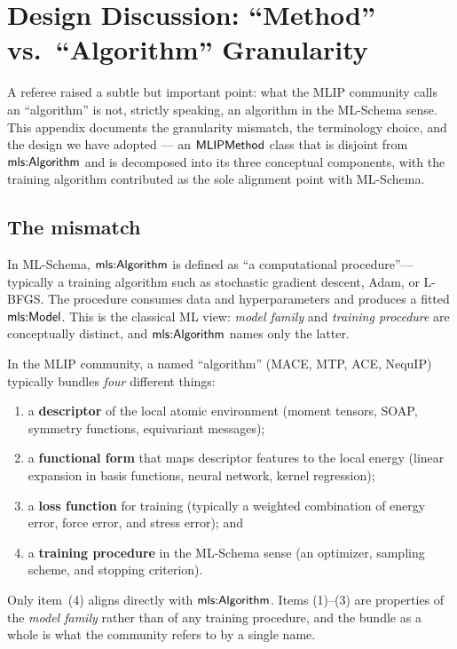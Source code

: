 \section{Design Discussion: ``Method'' vs.\ ``Algorithm'' Granularity}
\label{sec:appendix-method}

A referee raised a subtle but important point: what the MLIP community
calls an ``algorithm'' is not, strictly speaking, an algorithm in the
ML-Schema sense. This appendix documents the granularity mismatch, the
terminology choice, and the design we have adopted --- an
$\mathsf{MLIPMethod}$ class that is disjoint from $\mathsf{mls{:}Algorithm}$ and is
decomposed into its three conceptual components, with the training
algorithm contributed as the sole alignment point with ML-Schema.

\subsection{The mismatch}

In ML-Schema, $\mathsf{mls{:}Algorithm}$ is defined as ``a computational
procedure''---typically a training algorithm such as stochastic gradient
descent, Adam, or L-BFGS. The procedure consumes data and hyperparameters
and produces a fitted $\mathsf{mls{:}Model}$. This is the classical ML view:
\emph{model family} and \emph{training procedure} are conceptually
distinct, and $\mathsf{mls{:}Algorithm}$ names only the latter.

In the MLIP community, a named ``algorithm'' (MACE, MTP, ACE, NequIP)
typically bundles \emph{four} different things:
%
\begin{enumerate}
\item a \textbf{descriptor} of the local atomic environment (moment
  tensors, SOAP, symmetry functions, equivariant messages);
\item a \textbf{functional form} that maps descriptor features to the
  local energy (linear expansion in basis functions, neural network,
  kernel regression);
\item a \textbf{loss function} for training (typically a weighted
  combination of energy error, force error, and stress error); and
\item a \textbf{training procedure} in the ML-Schema sense (an
  optimizer, sampling scheme, and stopping criterion).
\end{enumerate}
%
Only item~(4) aligns directly with $\mathsf{mls{:}Algorithm}$. Items (1)--(3) are
properties of the \emph{model family} rather than of any training
procedure, and the bundle as a whole is what the community refers to
by a single name.

